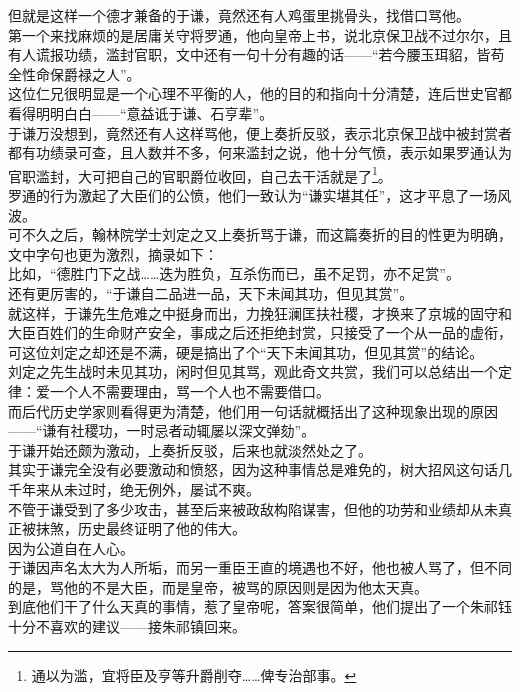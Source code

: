 \begin{multicols}{\theparacolNo}
但就是这样一个德才兼备的于谦，竟然还有人鸡蛋里挑骨头，找借口骂他。\\

第一个来找麻烦的是居庸关守将罗通，他向皇帝上书，说北京保卫战不过尔尔，且有人谎报功绩，滥封官职，文中还有一句十分有趣的话——“若今腰玉珥貂，皆苟全性命保爵禄之人”。\\

这位仁兄很明显是一个心理不平衡的人，他的目的和指向十分清楚，连后世史官都看得明明白白——“意益诋于谦、石亨辈”。\\

于谦万没想到，竟然还有人这样骂他，便上奏折反驳，表示北京保卫战中被封赏者都有功绩录可查，且人数并不多，何来滥封之说，他十分气愤，表示如果罗通认为官职滥封，大可把自己的官职爵位收回，自己去干活就是了\footnote{通以为滥，宜将臣及亨等升爵削夺……俾专治部事。}。\\

罗通的行为激起了大臣们的公愤，他们一致认为“谦实堪其任”，这才平息了一场风波。\\

可不久之后，翰林院学士刘定之又上奏折骂于谦，而这篇奏折的目的性更为明确，文中字句也更为激烈，摘录如下：\\

比如，“德胜门下之战……迭为胜负，互杀伤而已，虽不足罚，亦不足赏”。\\

还有更厉害的，“于谦自二品进一品，天下未闻其功，但见其赏”。\\

就这样，于谦先生危难之中挺身而出，力挽狂澜匡扶社稷，才换来了京城的固守和大臣百姓们的生命财产安全，事成之后还拒绝封赏，只接受了一个从一品的虚衔，可这位刘定之却还是不满，硬是搞出了个“天下未闻其功，但见其赏”的结论。\\

刘定之先生战时未见其功，闲时但见其骂，观此奇文共赏，我们可以总结出一个定律：爱一个人不需要理由，骂一个人也不需要借口。\\

而后代历史学家则看得更为清楚，他们用一句话就概括出了这种现象出现的原因——“谦有社稷功，一时忌者动辄屡以深文弹劾”。\\

于谦开始还颇为激动，上奏折反驳，后来也就淡然处之了。\\

其实于谦完全没有必要激动和愤怒，因为这种事情总是难免的，树大招风这句话几千年来从未过时，绝无例外，屡试不爽。\\

不管于谦受到了多少攻击，甚至后来被政敌构陷谋害，但他的功劳和业绩却从未真正被抹煞，历史最终证明了他的伟大。\\

因为公道自在人心。\\

于谦因声名太大为人所垢，而另一重臣王直的境遇也不好，他也被人骂了，但不同的是，骂他的不是大臣，而是皇帝，被骂的原因则是因为他太天真。\\

到底他们干了什么天真的事情，惹了皇帝呢，答案很简单，他们提出了一个朱祁钰十分不喜欢的建议——接朱祁镇回来。\\
\ifnum{}
	\end{multicols}
\fi
\newpage
